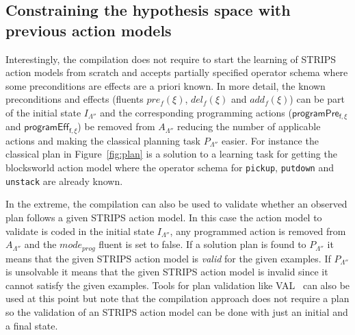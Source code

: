 \documentclass[letterpaper]{article} %
\begin{document}
\subsection{Constraining the hypothesis space with previous action models}
Interestingly, the compilation does not require to start the learning of STRIPS action models from scratch and accepts partially specified operator schema where some preconditions are effects are a priori known. In more detail, the known preconditions and effects (fluents $pre_f(\xi)$, $del_f(\xi)$ and $add_f(\xi)$) can be part of the initial state $I_{\Lambda''}$ and the corresponding programming actions ($\mathsf{programPre_{f,\xi}}$ and $\mathsf{programEff_{f,\xi}}$) be removed from $A_{\Lambda''}$ reducing the number of applicable actions  and making the classical planning task $P_{\Lambda''}$ easier. For instance the classical plan in Figure~\ref{fig:plan} is a solution to a learning task for getting the blocksworld action model where the operator schema for {\tt\small pickup}, {\tt\small putdown} and {\tt\small unstack} are already known. 

In the extreme, the compilation can also be used to validate whether an observed plan follows a given STRIPS action model. In this case the action model to validate is coded in the initial state $I_{\Lambda''}$, any programmed action is removed from $A_{\Lambda''}$ and the $mode_{prog}$ fluent is set to false. If a solution plan is found to $P_{\Lambda''}$ it means that the given STRIPS action model is {\em valid} for the given examples. If $P_{\Lambda''}$ is unsolvable it means that the given STRIPS action model is invalid since it cannot satisfy the given examples. Tools for plan validation like VAL~\cite{howey2004val} can also be used at this point but note that the compilation approach does not require a plan so the validation of an STRIPS action model can be done with just an initial and a final state.
\end{document}
